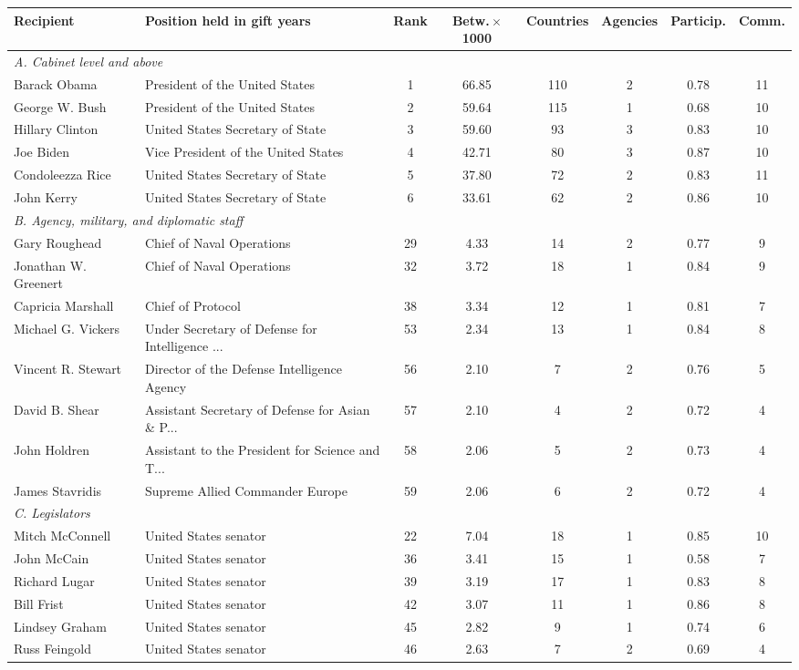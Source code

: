 \begin{tabular}{llcccccc}
\toprule
Recipient & Position held in gift years & Rank & Betw.\,$\times$1000 & Countries & Agencies & Particip. & Comm. \\
\midrule
\multicolumn{8}{l}{\emph{A. Cabinet level and above}} \\
Barack Obama & President of the United States & 1 & 66.85 & 110 & 2 & 0.78 & 11 \\
George W. Bush & President of the United States & 2 & 59.64 & 115 & 1 & 0.68 & 10 \\
Hillary Clinton & United States Secretary of State & 3 & 59.60 & 93 & 3 & 0.83 & 10 \\
Joe Biden & Vice President of the United States & 4 & 42.71 & 80 & 3 & 0.87 & 10 \\
Condoleezza Rice & United States Secretary of State & 5 & 37.80 & 72 & 2 & 0.83 & 11 \\
John Kerry & United States Secretary of State & 6 & 33.61 & 62 & 2 & 0.86 & 10 \\
\midrule
\multicolumn{8}{l}{\emph{B. Agency, military, and diplomatic staff}} \\
Gary Roughead & Chief of Naval Operations & 29 & 4.33 & 14 & 2 & 0.77 & 9 \\
Jonathan W. Greenert & Chief of Naval Operations & 32 & 3.72 & 18 & 1 & 0.84 & 9 \\
Capricia Marshall & Chief of Protocol & 38 & 3.34 & 12 & 1 & 0.81 & 7 \\
Michael G. Vickers & Under Secretary of Defense for Intelligence ... & 53 & 2.34 & 13 & 1 & 0.84 & 8 \\
Vincent R. Stewart & Director of the Defense Intelligence Agency & 56 & 2.10 & 7 & 2 & 0.76 & 5 \\
David B. Shear & Assistant Secretary of Defense for Asian \& P... & 57 & 2.10 & 4 & 2 & 0.72 & 4 \\
John Holdren & Assistant to the President for Science and T... & 58 & 2.06 & 5 & 2 & 0.73 & 4 \\
James Stavridis & Supreme Allied Commander Europe & 59 & 2.06 & 6 & 2 & 0.72 & 4 \\
\midrule
\multicolumn{8}{l}{\emph{C. Legislators}} \\
Mitch McConnell & United States senator & 22 & 7.04 & 18 & 1 & 0.85 & 10 \\
John McCain & United States senator & 36 & 3.41 & 15 & 1 & 0.58 & 7 \\
Richard Lugar & United States senator & 39 & 3.19 & 17 & 1 & 0.83 & 8 \\
Bill Frist & United States senator & 42 & 3.07 & 11 & 1 & 0.86 & 8 \\
Lindsey Graham & United States senator & 45 & 2.82 & 9 & 1 & 0.74 & 6 \\
Russ Feingold & United States senator & 46 & 2.63 & 7 & 2 & 0.69 & 4 \\
\bottomrule
\end{tabular}
